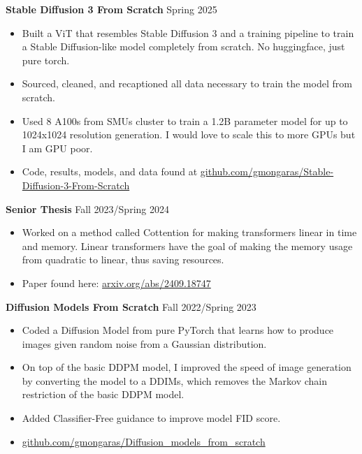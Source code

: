 \documentclass[a4paper,10pt]{article}
\begin{document}
\vspace{1pt}
 \vspace{1pt}

\noindent\textbf{Stable Diffusion 3 From Scratch} \hfill Spring  2025
\begin{itemize}[noitemsep,topsep=0pt]
  \item Built a ViT that resembles Stable Diffusion 3 and a training pipeline to train a Stable Diffusion-like model completely from scratch. No huggingface, just pure torch.
  \item Sourced, cleaned, and recaptioned all data necessary to train the model from scratch.
  \item Used 8 A100s from SMUs cluster to train a 1.2B parameter model for up to 1024x1024 resolution generation. I would love to scale this to more GPUs but I am GPU poor.
  \item Code, results, models, and data found at \href{https://github.com/gmongaras/Stable-Diffusion-3-From-Scratch}{github.com/gmongaras/Stable-Diffusion-3-From-Scratch}
\end{itemize}

\noindent\textbf{Senior Thesis} \hfill Fall 2023/Spring 2024
\begin{itemize}[noitemsep,topsep=0pt]
  \item Worked on a method called Cottention for making transformers linear in time and memory. Linear transformers have the goal of making the memory usage from quadratic to linear, thus saving resources.
  \item Paper found here: \href{https://arxiv.org/abs/2409.18747}{arxiv.org/abs/2409.18747}
\end{itemize}

\noindent\textbf{Diffusion Models From Scratch} \hfill Fall 2022/Spring 2023
\begin{itemize}[noitemsep,topsep=0pt]
  \item Coded a Diffusion Model from pure PyTorch that learns how to produce images given random noise from a Gaussian distribution.
  \item On top of the basic DDPM model, I improved the speed of image generation by converting the model to a DDIMs, which removes the Markov chain restriction of the basic DDPM model.
  \item Added Classifier-Free guidance to improve model FID score.
  \item \href{https://github.com/gmongaras/Diffusion_models_from_scratch}{github.com/gmongaras/Diffusion\_models\_from\_scratch}
\end{itemize}
\end{document}
